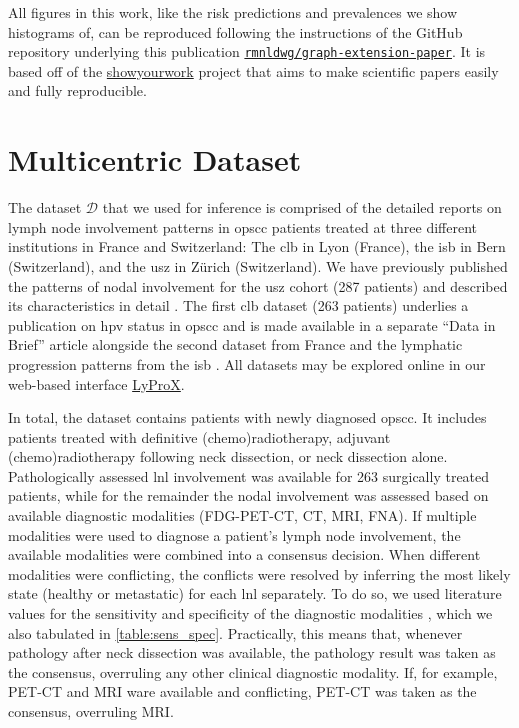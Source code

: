 \documentclass[twocolumn]{aastex631}
\begin{document}
All figures in this work, like the risk predictions and prevalences we show histograms of, can be reproduced following the instructions of the GitHub repository underlying this publication \href{https://github.com/rmnldwg/graph-extension-paper}{\texttt{rmnldwg/graph-extension-paper}}. It is based off of the \href{https://show-your.work}{showyourwork} project that aims to make scientific papers easily and fully reproducible.


\section{Multicentric Dataset}
\label{sec:data}

The dataset $\boldsymbol{\mathcal{D}}$ that we used for inference is comprised of the detailed reports on lymph node involvement patterns in \gls{opscc} patients treated at three different institutions in France and Switzerland: The \gls{clb} in Lyon (France), the \gls{isb} in Bern (Switzerland), and the \gls{usz} in Zürich (Switzerland). We have previously published the patterns of nodal involvement for the \gls{usz} cohort (287 patients) \citep{ludwig_dataset_2022,ludwig_lydata_2023} and described its characteristics in detail \citep{ludwig_detailed_2022}. The first \gls{clb} dataset (263 patients) \citep{ludwig_lydata_2022} underlies a publication on \gls{hpv} status in \gls{opscc} \citep{bauwens_prevalence_2021} and is made available in a separate ``Data in Brief'' article alongside the second dataset from France \citep{ludwig_lydata_2023-2} and the lymphatic progression patterns from the \gls{isb} \citep{ludwig_lydata_2023-1,ludwig_multi-centric_2023}. All datasets may be explored online in our web-based interface \href{https://lyprox.org}{LyProX}.

In total, the dataset contains patients with newly diagnosed \gls{opscc}. It includes patients treated with definitive (chemo)radiotherapy, adjuvant (chemo)radiotherapy following neck dissection, or neck dissection alone. Pathologically assessed \gls{lnl} involvement was available for 263 surgically treated patients, while for the remainder the nodal involvement was assessed based on available diagnostic modalities (FDG-PET-CT, CT, MRI, FNA). If multiple modalities were used to diagnose a patient's lymph node involvement, the available modalities were combined into a consensus decision. When different modalities were conflicting, the conflicts were resolved by inferring the most likely state (healthy or metastatic) for each \gls{lnl} separately. To do so, we used literature values for the sensitivity and specificity of the diagnostic modalities \citep{de_bondt_Detection_2007,kyzas_18f-fluorodeoxyglucose_2008}, which we also tabulated in \autoref{table:sens_spec}. Practically, this means that, whenever pathology after neck dissection was available, the pathology result was taken as the consensus, overruling any other clinical diagnostic modality. If, for example, PET-CT and MRI ware available and conflicting, PET-CT was taken as the consensus, overruling MRI.
\end{document}
